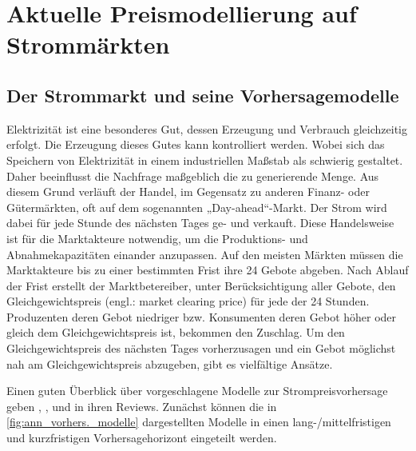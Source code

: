 

\section{Aktuelle Preismodellierung auf Strommärkten}\label{sec:strompreis}


\subsection{Der Strommarkt und seine Vorhersagemodelle}\label{sec:vorhersagemodelle}

Elektrizität ist eine besonderes Gut, dessen Erzeugung und Verbrauch gleichzeitig erfolgt. Die Erzeugung dieses Gutes kann kontrolliert werden. Wobei sich das Speichern von Elektrizität in einem industriellen Maßstab als schwierig gestaltet. Daher beeinflusst die Nachfrage maßgeblich die zu generierende Menge. Aus diesem Grund verläuft der Handel, im Gegensatz zu anderen Finanz- oder Gütermärkten, oft auf dem sogenannten „Day-ahead“-Markt. Der Strom wird dabei für jede Stunde des nächsten Tages ge- und verkauft. Diese Handelsweise ist für die Marktakteure notwendig, um die Produktions- und Abnahmekapazitäten einander anzupassen. Auf den meisten Märkten müssen die Marktakteure bis zu einer bestimmten Frist ihre 24 Gebote abgeben. Nach Ablauf der Frist erstellt der Marktbetereiber, unter Berücksichtigung aller Gebote, den Gleichgewichtspreis (engl.: market clearing price) für jede der 24 Stunden. Produzenten deren Gebot niedriger bzw. Konsumenten deren Gebot höher oder gleich dem Gleichgewichtspreis ist, bekommen den Zuschlag. Um den Gleichgewichtspreis des nächsten Tages vorherzusagen und ein Gebot möglichst nah am Gleichgewichtspreis abzugeben, gibt es vielfältige Ansätze.

Einen guten Überblick über vorgeschlagene Modelle zur Strompreisvorhersage geben \citet{Aggarwal2009}, \citet{Cerjan2013}, \citet{Weron2014} und \citet{Panapakidis2016} in ihren Reviews. Zunächst können die in \autoref{fig:ann_vorhers._modelle} dargestellten Modelle in einen lang-/mittelfristigen und kurzfristigen Vorhersagehorizont eingeteilt werden. 

